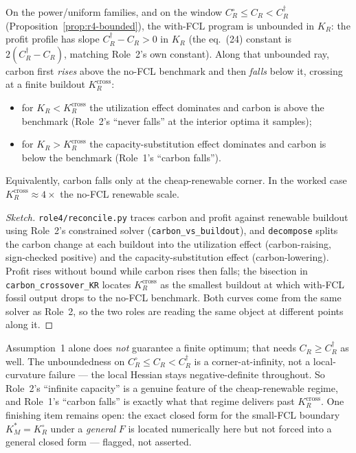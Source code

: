 \begin{proposition}
\label{prop:r4-reconcile}
On the power/uniform families, and on the window $C_R^\circ\le C_R<C_R^\dagger$
(Proposition~\ref{prop:r4-bounded}), the with-FCL program is unbounded in $K_R$: the
profit profile has slope $C_R^\dagger-C_R>0$ in $K_R$ (the eq.~(24) constant is
$2(C_R^\dagger-C_R)$, matching Role~2's own constant). Along that unbounded ray, carbon
first \emph{rises} above the no-FCL benchmark and then \emph{falls} below it, crossing
at a finite buildout $K_R^{\mathrm{cross}}$:
\begin{itemize}
\item for $K_R<K_R^{\mathrm{cross}}$ the utilization effect dominates and carbon is
above the benchmark (Role~2's ``never falls'' at the interior optima it samples);
\item for $K_R>K_R^{\mathrm{cross}}$ the capacity-substitution effect dominates and
carbon is below the benchmark (Role~1's ``carbon falls'').
\end{itemize}
Equivalently, carbon falls only at the cheap-renewable corner. In the worked case
$K_R^{\mathrm{cross}}\approx 4\times$ the no-FCL renewable scale.
\end{proposition}

\begin{proof}[Sketch]
\texttt{role4/reconcile.py} traces carbon and profit against renewable buildout using
Role~2's constrained solver (\texttt{carbon\_vs\_buildout}), and
\texttt{decompose} splits the carbon change at each buildout into the
utilization effect (carbon-raising, sign-checked positive) and the
capacity-substitution effect (carbon-lowering). Profit rises without bound while carbon
rises then falls; the bisection in \texttt{carbon\_crossover\_KR} locates
$K_R^{\mathrm{cross}}$ as the smallest buildout at which with-FCL fossil output drops to
the no-FCL benchmark. Both curves come from the same solver as Role~2, so the two roles
are reading the same object at different points along it.
\end{proof}

\begin{remark}
Assumption~1 alone does \emph{not} guarantee a finite optimum; that needs
$C_R\ge C_R^\dagger$ as well. The unboundedness on $C_R^\circ\le C_R<C_R^\dagger$ is a
corner-at-infinity, not a local-curvature failure --- the local Hessian stays
negative-definite throughout. So Role~2's ``infinite capacity'' is a genuine feature of
the cheap-renewable regime, and Role~1's ``carbon falls'' is exactly what that regime
delivers past $K_R^{\mathrm{cross}}$. One finishing item remains open: the exact closed
form for the small-FCL boundary $K_M^*=K_R^\circ$ under a \emph{general} $F$ is located
numerically here but not forced into a general closed form --- flagged, not asserted.
\end{remark}
